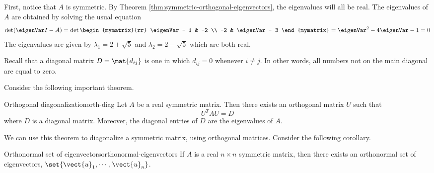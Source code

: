 \begin{solution}
First, notice that $A$ is symmetric. By Theorem \ref{thm:symmetric-orthogonal-eigenvectors}, the eigenvalues will all be real. The eigenvalues of $A$ are obtained by solving the usual equation 
\[
\det (\eigenVar I - A) = 
\det \begin{mymatrix}{rr}
\eigenVar - 1 & -2 \\ 
-2 & \eigenVar - 3 
\end{mymatrix} = \eigenVar^2 -4\eigenVar -1=0
\]
The eigenvalues are given by $\lambda_1 =2+
\sqrt{5}$ and $\lambda_2 =2-\sqrt{5}$ which are both real. 
\end{solution}

Recall that a diagonal matrix $D=\mat{d_{ij} }$ is one in which $d_{ij} = 0$ whenever $i \neq j$. In other words, all numbers not on the main diagonal are equal to zero. 

Consider the following important theorem.

\begin{theorem}{Orthogonal diagonalization}{orth-diag}
Let $A$ be a real symmetric matrix. Then there exists an
orthogonal matrix $U$ such that 
\[
U^{T}AU = D
\]
where $D$ is a diagonal matrix. Moreover,
the diagonal entries of $D$ are the eigenvalues of $A$.
\end{theorem}

We can use this theorem to diagonalize a symmetric matrix, using orthogonal matrices. Consider the following corollary.

\begin{corollary}{Orthonormal set of eigenvectors}{orthonormal-eigenvectors}
If $A$ is a real $n\times n$ symmetric matrix, then there exists an
orthonormal set of eigenvectors, $\set{\vect{u}_{1},\cdots ,\vect{u}
_{n}}$.
\end{corollary}

